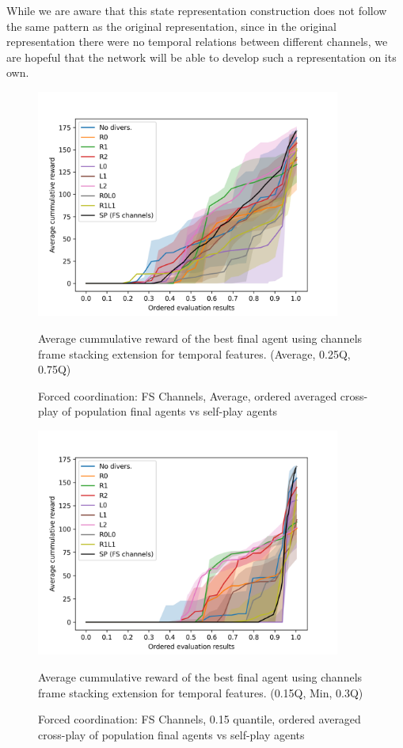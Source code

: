 While we are aware that this state representation construction does not follow the same pattern as the original representation, since in the original representation there were no temporal relations between different channels, we are hopeful that the network will be able to develop such a representation on its own.

\begin{figure}[!ht]
    \centering
    \includegraphics*[width=10cm]{../img/FSChannelsOrderedAvg.png}

    \caption{Forced coordination: FS Channels, Average, ordered averaged cross-play of population final agents vs self-play agents}
    \label{FSChannelsOrderedAvg}
    \medskip
    \small 
    Average cummulative reward of the best final agent using channels frame stacking extension for temporal features.    
    (Average, 0.25Q, 0.75Q)

\end{figure}

\begin{figure}[!ht]
    \centering
    \includegraphics*[width=10cm]{../img/FSChannelsOrderedQ15.png}
    
    \caption{Forced coordination: FS Channels, 0.15 quantile, ordered averaged cross-play of population final agents vs self-play agents}
    \label{FSChannelsOrderedQ15}
    \medskip
    \small 
    Average cummulative reward of the best final agent using channels frame stacking extension for temporal features. 
    (0.15Q, Min, 0.3Q)

\end{figure}

